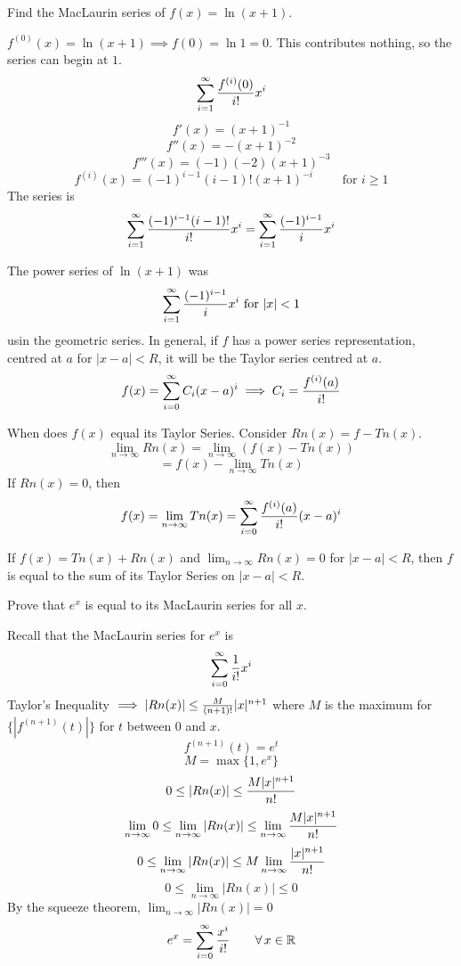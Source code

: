 \documentclass[english, 12pt]{article}
\begin{document}
\begin{exmp}
Find the MacLaurin series of $f(x) = \ln(x+1)$.
\begin{sol}
$f^{(0)} (x) = \ln(x+1) \implies f(0) = \ln 1 = 0$. This contributes nothing, so the series can begin at $1$.
\[ \sum_{i=1}^\infty \frac{f^{(i)} (0)}{i!} x^i\]
\[f'(x) = (x+1)^{-1}\]
\[ f''(x) = -(x+1)^{-2}\]
\[ f'''(x) = (-1)(-2) (x+1)^{-3}\]
\[f^{(i)} (x) = (-1)^{i-1} (i-1)! (x+1)^{-i}\qquad \text{ for } i \geq 1\]
The series is 
\[ \sum_{i=1}^\infty \frac{(-1)^{i-1} (i-1)!}{i!} x^i = \sum_{i=1}^\infty \frac{(-1)^{i-1}}{i} x^i\]
\end{sol}
\end{exmp}

\begin{rem}
The power series of $\ln(x+1)$ was 
\[ \sum_{i=1}^\infty \frac{(-1)^{i-1}}{i} x^i \text{ for } |x| < 1\]
usin the geometric series. In general, if $f$ has a power series representation, centred at $a$ for $|x-a| < R$, it will be the Taylor series centred at $a$.
\[ f(x) = \sum_{i=0}^\infty C_{i} (x-a)^i \implies C_{i} = \frac{f^{(i)} (a)}{i!} \]
\end{rem}
When does $f(x)$ equal its Taylor Series.
Consider $Rn(x) = f - Tn(x)$.
\[ \lim_{n\to\infty} Rn(x) = \lim_{n\to\infty} \left(f(x) - Tn(x)\right)\]
\[ = f(x) - \lim_{n\to\infty} Tn(x)\]
If $Rn(x) = 0$, then
\[ f(x) = \lim_{n\to\infty} Tn(x) = \sum_{i=0}^\infty \frac{f^{(i)} (a)}{i!} (x-a)^i\]
\begin{thrm}
If $f(x) = Tn(x) + Rn(x)$ and $\lim_{n\to\infty} Rn(x) = 0$ for $|x-a| < R$, then $f$ is equal to the sum of its Taylor Series on $|x-a| < R$.
\end{thrm}
\begin{exmp}
Prove that $e^x$ is equal to its MacLaurin series for all $x$.
\begin{sol}
Recall that the MacLaurin series for $e^x$ is 
\[ \sum_{i=0}^\infty \frac{1}{i!} x^i\]
Taylor's Inequality $\implies |Rn(x)| \leq \frac{M}{(n+1)!} |x|^{n+1}$ where $M$ is the maximum for $\{|f^{(n+1)} (t)|\}$ for $t$ between $0$ and $x$.
\[ f^{(n+1)} (t) = e^t\]
\[ M = \max\{1,e^x\}\]
\[ 0 \leq |Rn(x)| \leq \frac{M |x|^{n+1}}{n!}\]
\[ \lim_{n\to\infty} 0 \leq \lim_{n\to\infty}|Rn(x)| \leq \lim_{n\to\infty} \frac{M |x|^{n+1}}{n!}\]
\[ 0 \leq \lim_{n\to\infty} |Rn(x)| \leq  M \lim_{n\to\infty} \frac{|x|^{n+1}}{n!} \]
\[ 0 \leq \lim_{n\to\infty} |Rn(x)| \leq 0\]
By the squeeze theorem, $\lim_{n\to\infty} |Rn(x)| = 0$
\[ e^x = \sum_{i=0}^\infty \frac{x^i}{i!} \qquad \forall\, x \in {\mathbb{R}}\]
\end{sol}
\end{exmp}
\end{document}
